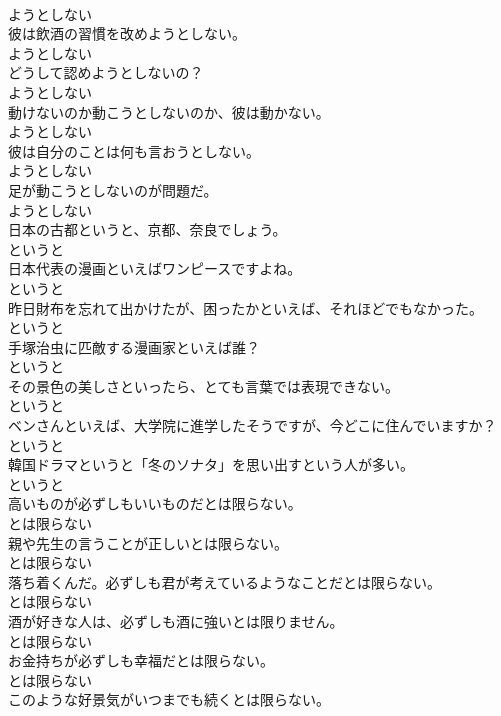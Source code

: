 \documentclass[8pt]{extreport}
\begin{document}
\begin{CJK}{UTF8}{min}
\\	ようとしない
\\	彼は飲酒の習慣を改めようとしない。	
\\	ようとしない
\\	どうして認めようとしないの？	
\\	ようとしない
\\	動けないのか動こうとしないのか、彼は動かない。	
\\	ようとしない
\\	彼は自分のことは何も言おうとしない。	
\\	ようとしない
\\	足が動こうとしないのが問題だ。	
\\	ようとしない
\\	日本の古都というと、京都、奈良でしょう。	
\\	というと
\\	日本代表の漫画といえばワンピースですよね。	
\\	というと
\\	昨日財布を忘れて出かけたが、困ったかといえば、それほどでもなかった。	
\\	というと
\\	手塚治虫に匹敵する漫画家といえば誰？	
\\	というと
\\	その景色の美しさといったら、とても言葉では表現できない。	
\\	というと
\\	ベンさんといえば、大学院に進学したそうですが、今どこに住んでいますか？	
\\	というと
\\	韓国ドラマというと「冬のソナタ」を思い出すという人が多い。	
\\	というと
\\	高いものが必ずしもいいものだとは限らない。	
\\	とは限らない
\\	親や先生の言うことが正しいとは限らない。	
\\	とは限らない
\\	落ち着くんだ。必ずしも君が考えているようなことだとは限らない。	
\\	とは限らない
\\	酒が好きな人は、必ずしも酒に強いとは限りません。	
\\	とは限らない
\\	お金持ちが必ずしも幸福だとは限らない。	
\\	とは限らない
\\	このような好景気がいつまでも続くとは限らない。	

\end{CJK}
\end{document}
